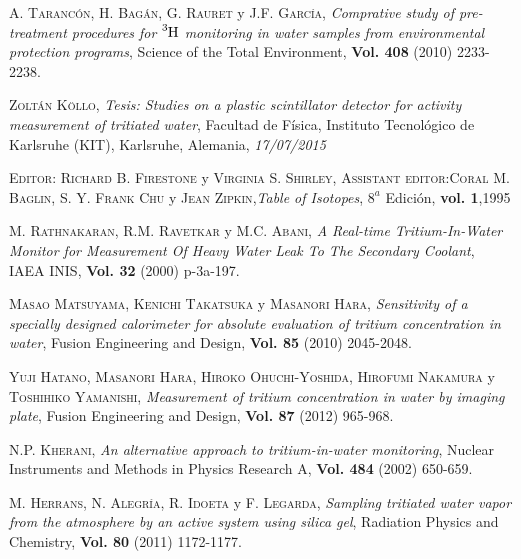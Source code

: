 \begin{thebibliography}{100}
 \textsc{A. Tarancón}, \textsc{H. Bagán}, \textsc{G. Rauret} y \textsc{J.F. García},
\textit{Comprative study of pre-treatment procedures for $\ce{^{3}H}$ monitoring in water samples from environmental protection programs}, Science of the Total Environment, \textbf{Vol. 408} (2010) 2233-2238.

 \textsc{Zoltán Köllo},
\textit{Tesis: Studies on a plastic scintillator detector for activity measurement of tritiated water}, Facultad de Física, Instituto Tecnológico de Karlsruhe (KIT), Karlsruhe, Alemania, \textit{17/07/2015}

 \textsc{Editor:} \textsc{Richard B. Firestone} y \textsc{Virginia S. Shirley}, \textsc{Assistant editor:}\textsc{Coral M. Baglin}, \textsc{S. Y. Frank Chu} y \textsc{Jean Zipkin},\textit{Table of Isotopes},  $8^a$ Edición, \textbf{vol. 1},1995 


 \textsc{M. Rathnakaran}, \textsc{R.M. Ravetkar} y \textsc{M.C. Abani},
\textit{A Real-time Tritium-In-Water Monitor for Measurement Of Heavy Water Leak To The Secondary Coolant}, \textsc{IAEA INIS}, \textbf{Vol. 32} (2000) p-3a-197.

 \textsc{Masao Matsuyama}, \textsc{Kenichi Takatsuka} y \textsc{Masanori Hara}, 
\textit{Sensitivity of a specially designed calorimeter for absolute evaluation of tritium concentration in water}, Fusion Engineering and Design, \textbf{Vol. 85} (2010) 2045-2048.

 \textsc{Yuji Hatano}, \textsc{Masanori Hara}, \textsc{Hiroko Ohuchi-Yoshida}, \textsc{Hirofumi Nakamura} y \textsc{Toshihiko Yamanishi},
\textit{Measurement of tritium concentration in water by imaging plate}, Fusion Engineering and Design, \textbf{Vol. 87} (2012) 965-968.

\textsc{N.P. Kherani},
\textit{An alternative approach to tritium-in-water monitoring}, Nuclear Instruments and Methods in Physics Research A, \textbf{Vol. 484} (2002) 650-659.

 \textsc{M. Herrans}, \textsc{N. Alegría}, \textsc{R. Idoeta} y \textsc{F. Legarda},
\textit{Sampling tritiated water vapor from the atmosphere by an active system using silica gel}, Radiation Physics and Chemistry, \textbf{Vol. 80} (2011) 1172-1177.


\end{thebibliography}
